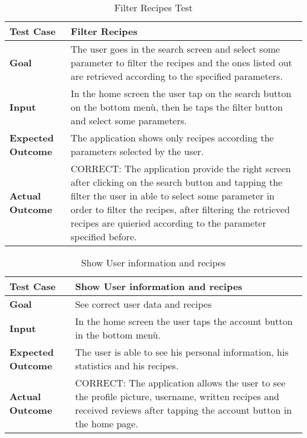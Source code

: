 \begin{table}[H]
	\centering
	\begin{tabular}{|l|l|}
	\hline
	\textbf{Test Case}& Filter Recipes\\
	\hline
	\textbf{Goal}& 
	\begin{minipage}{.7\linewidth}
	The user goes in the search screen and select some parameter to filter the recipes and the ones listed out are retrieved according to the specified parameters.
	\end{minipage}\\
	\hline
	\textbf{Input}& 
	\begin{minipage}{.7\linewidth}
	In the home screen the user tap on the search button on the bottom menù, then he taps the filter button and select some parameters.
	\end{minipage}\\
	\hline
	\textbf{Expected Outcome}& 
	\begin{minipage}{.7\linewidth}
	The application shows only recipes according the parameters selected by the user.
	\end{minipage}\\
	\hline
	\textbf{Actual Outcome}& 
	\begin{minipage}{.7\linewidth}
	CORRECT: The application provide the right screen after clicking on the search button and tapping the filter the user in able to select some parameter in order to filter the recipes, after filtering the retrieved recipes are quieried according to the parameter specified before.
	\end{minipage}\\
	\hline	
	\end{tabular}
	\caption{Filter Recipes Test}
\end{table}

\begin{table}[H]
	\centering
	\begin{tabular}{|l|l|}
	\hline
	\textbf{Test Case}& Show User information and recipes\\
	\hline
	\textbf{Goal}& See correct user data and recipes\\
	\hline
	\textbf{Input}& In the home screen the user taps the account button in the bottom menù.\\
	\hline
	\textbf{Expected Outcome}& 
	\begin{minipage}{.7\linewidth}
	The user is able to see his personal information, his statistics and his recipes.
	\end{minipage}\\
	\hline
	\textbf{Actual Outcome}&
	\begin{minipage}{.7\linewidth}
	CORRECT: The application allows the user to see the profile picture, username, written recipes and received reviews after tapping the account button in the home page.
	\end{minipage}\\
	\hline	
	\end{tabular}
	\caption{Show User information and recipes}
\end{table}

